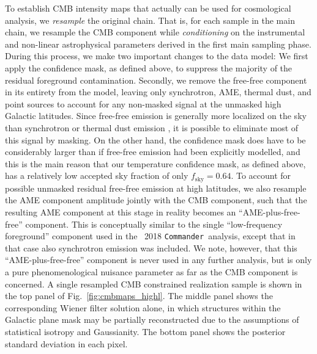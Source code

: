 \documentclass[twocolumn]{aa}
\def\commander{\texttt{Commander}}
\begin{document}
To establish CMB intensity maps that actually can be used for
cosmological analysis, we \emph{resample} the original chain. That is,
for each sample in the main chain, we resample the CMB component while
\emph{conditioning} on the instrumental and non-linear astrophysical
parameters derived in the first main sampling phase. During this
process, we make two important changes to the data model: We first
apply the confidence mask, as defined above, to suppress the majority
of the residual foreground contamination. Secondly, we remove the
free-free component in its entirety from the model, leaving only
synchrotron, AME, thermal dust, and point sources to account for any
non-masked signal at the unmasked high Galactic latitudes. Since
free-free emission is generally more localized on the sky than
synchrotron or thermal dust emission \citep{planck2014-a10,bp13}, it
is possible to eliminate most of this signal by masking. On the other
hand, the confidence mask does have to be considerably larger than if
free-free emission had been explicitly modelled, and this is the main
reason that our temperature confidence mask, as defined above, has a
relatively low accepted sky fraction of only
$f_{\mathrm{sky}}=0.64$. To account for possible unmasked residual
free-free emission at high latitudes, we also resample the AME
component amplitude jointly with the CMB component, such that the
resulting AME component at this stage in reality becomes an
``AME-plus-free-free'' component. This is conceptually similar to the
single ``low-frequency foreground'' component used in the
\Planck\ 2018 \commander\ analysis, except that in that case also
synchrotron emission was included. We note, however, that this
``AME-plus-free-free'' component is never used in any further
analysis, but is only a pure phenomenological nuisance parameter as
far as the CMB component is concerned. A single resampled CMB
constrained realization sample is shown in the top panel of
Fig.~\ref{fig:cmbmaps_highl}. The middle panel shows the corresponding
Wiener filter solution alone, in which structures within the Galactic
plane mask may be partially reconstructed due to the assumptions
of statistical isotropy and Gaussianity. The bottom panel shows the
posterior standard deviation in each pixel.
\end{document}
